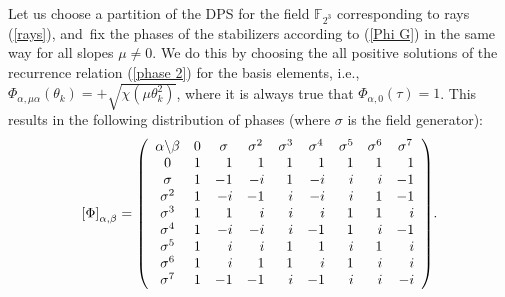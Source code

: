 \documentclass[quantumrep,article,accept,pdftex,moreauthors]{Definitions/mdpi}
\begin{document}
Let us choose a partition of the DPS for the field $\mathbb{F}_{2^{3}}$
corresponding to rays (\ref{rays}), and~fix the phases of the stabilizers
according to (\ref{Phi G}) in the same way for all slopes $\mu \neq 0$. We do
this by choosing the all positive solutions of the recurrence relation
(\ref{phase 2}) for the basis elements, i.e.,
$\Phi_{\alpha,\mu\alpha}(\theta_{k})=+\sqrt{\chi\left(\mu\theta_{k}^{2}\right)}$,
where it is always true that $\Phi_{\alpha,0}(\tau)=1$. This results in
the following distribution of phases (where $\sigma$ is the field generator):
\begin{equation}
  \left[\Phi\right]_{\alpha ,\beta }
  = \left( 
    \begin{array}{ccccccccc}
      \alpha \backslash \beta  & 0 & \sigma  & \sigma ^{2} & \sigma ^{3} &
      \sigma^{4} & \sigma ^{5} & \sigma ^{6} & \sigma ^{7} \\ 
      0 & \multicolumn{1}{r}{1} & \multicolumn{1}{r}{1} & \multicolumn{1}{r}{1}
        & \multicolumn{1}{r}{1} & \multicolumn{1}{r}{1} & \multicolumn{1}{r}{1}
        & \multicolumn{1}{r}{1} & \multicolumn{1}{r}{1} \\ 
      \sigma  & \multicolumn{1}{r}{1} & \multicolumn{1}{r}{-1} &
      \multicolumn{1}{r}{-i} & \multicolumn{1}{r}{1} & \multicolumn{1}{r}{-i} &
      \multicolumn{1}{r}{i} & \multicolumn{1}{r}{i} & \multicolumn{1}{r}{-1} \\ 
      \sigma ^{2} & \multicolumn{1}{r}{1} & \multicolumn{1}{r}{-i} & 
      \multicolumn{1}{r}{-1} & \multicolumn{1}{r}{i} & \multicolumn{1}{r}{-i} & 
      \multicolumn{1}{r}{i} & \multicolumn{1}{r}{1} & \multicolumn{1}{r}{-1} \\ 
      \sigma ^{3} & \multicolumn{1}{r}{1} & \multicolumn{1}{r}{1} & 
      \multicolumn{1}{r}{i} & \multicolumn{1}{r}{i} & \multicolumn{1}{r}{i} & 
      \multicolumn{1}{r}{1} & \multicolumn{1}{r}{1} & \multicolumn{1}{r}{i} \\ 
      \sigma ^{4} & \multicolumn{1}{r}{1} & \multicolumn{1}{r}{-i} & 
      \multicolumn{1}{r}{-i} & \multicolumn{1}{r}{i} & \multicolumn{1}{r}{-1} & 
      \multicolumn{1}{r}{1} & \multicolumn{1}{r}{i} & \multicolumn{1}{r}{-1} \\ 
      \sigma ^{5} & \multicolumn{1}{r}{1} & \multicolumn{1}{r}{i} & 
      \multicolumn{1}{r}{i} & \multicolumn{1}{r}{1} & \multicolumn{1}{r}{1} & 
      \multicolumn{1}{r}{i} & \multicolumn{1}{r}{1} & \multicolumn{1}{r}{i} \\ 
      \sigma ^{6} & \multicolumn{1}{r}{1} & \multicolumn{1}{r}{i} & 
      \multicolumn{1}{r}{1} & \multicolumn{1}{r}{1} & \multicolumn{1}{r}{i} & 
      \multicolumn{1}{r}{1} & \multicolumn{1}{r}{i} & \multicolumn{1}{r}{i} \\ 
      \sigma ^{7} & \multicolumn{1}{r}{1} & \multicolumn{1}{r}{-1} & 
      \multicolumn{1}{r}{-1} & \multicolumn{1}{r}{i} & \multicolumn{1}{r}{-1} & 
      \multicolumn{1}{r}{i} & \multicolumn{1}{r}{i} & \multicolumn{1}{r}{-i}
      \end{array}
    \right).
  \label{ray dps}
\end{equation}
\end{document}
